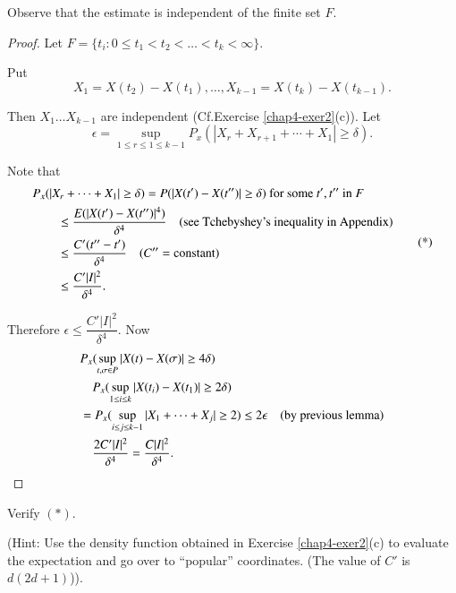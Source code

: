 \begin{remark*}
Observe that the estimate is independent of the finite set $F$. 
\end{remark*}

\begin{proof}
Let $F=\{t_{i}:0\leq t_{1}<t_{2}<\ldots<t_{k}<\infty\}$.

Put
$$
X_{1}=X(t_{2})-X(t_{1}),\ldots,X_{k-1}=X(t_{k})-X(t_{k-1}).
$$

Then $X_{1}\ldots X_{k-1}$ are independent (Cf.\@ Exercise
\ref{chap4-exer2}(c)). Let
$$
\epsilon=\sup\limits_{1\leq r\leq 1\leq
  k-1}P_{x}(|X_{r}+X_{r+1}+\cdots+X_{1}|\geq \delta).
$$

Note that
{\fontsize{10pt}{12pt}\selectfont
\begin{equation*}
\begin{split}
& P_{x}(|X_{r}+\cdots+X_{1}|\geq \delta)=P(|X(t')-X(t'')|\geq
\delta)\text{~ for some~ } t',t''\text{~ in~ }F\\
&\qquad \leq \dfrac{E(|X(t')-X(t'')|^{4})}{\delta^{4}}\quad\text{(see
  Tchebyshey's inequality in Appendix)}\\
&\qquad \leq \frac{C'(t''-t')}{\delta^{4}}\quad (C''=\text{constant})\\
&\qquad \leq \frac{C'|I|^{2}}{\delta^{4}}.
\end{split}\tag{*}
\end{equation*}}\relax

Therefore $\epsilon\leq \dfrac{C'|I|^{2}}{\delta^{4}}$. Now
\begin{align*}
& P_{x}(\sup\limits_{t,\sigma\in P}|X(t)-X(\sigma)|\geq 4\delta)\\
&\quad P_{x}(\sup\limits_{1\leq i\leq k}|X(t_{i})-X(t_{1})|\geq
  2\delta)\\
&= P_{x}(\sup\limits_{i\leq j\leq k-1}|X_{1}+\cdots+X_{j}|\geq 2)\leq
  2\epsilon\quad \text{(by previous lemma)}\\
&\quad \frac{2C'|I|^{2}}{\delta^{4}}=\frac{C|I|^{2}}{\delta^{4}}.
\end{align*}\pageoriginale
\end{proof}

\begin{exercise}\label{chap4-exer5}
Verify $(*)$.

\smallskip
\noindent
(Hint: Use the density function obtained in Exercise
\ref{chap4-exer2}(c) to evaluate the expectation and go over to
``popular'' coordinates. (The value of $C'$ is $d(2d+1)$)).
\end{exercise}

